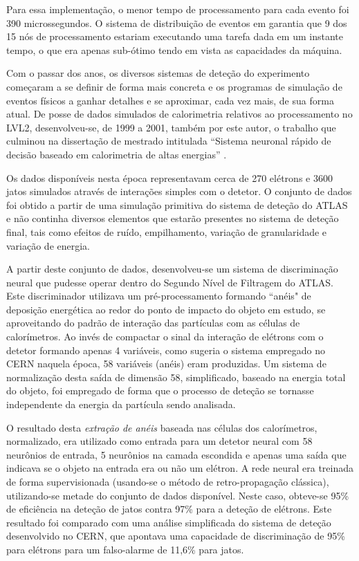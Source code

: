 Para essa implementação, o menor tempo de processamento para cada evento foi
390 microssegundos. O sistema de distribuição de eventos em
 garantia que 9 dos 15 nós de processamento estariam
executando uma tarefa dada em um instante tempo, o que era apenas sub-ótimo
tendo em vista as capacidades da máquina.

Com o passar dos anos, os diversos sistemas de deteção do experimento
começaram a se definir de forma mais concreta e os programas de simulação de
eventos físicos a ganhar detalhes e se aproximar, cada vez mais, de sua forma
atual. De posse de dados simulados de calorimetria relativos ao processamento
no LVL2, desenvolveu-se, de 1999 a 2001, também por este autor, o trabalho que
culminou na dissertação de mestrado intitulada ``Sistema neuronal rápido de
decisão baseado em calorimetria de altas energias'' \cite{aa:msc-thesis}.

Os dados disponíveis nesta época representavam cerca de 270 elétrons e 3600
jatos simulados através de interações simples com o detetor. O conjunto de
dados foi obtido a partir de uma simulação primitiva do sistema de deteção do
ATLAS e não continha diversos elementos que estarão presentes no sistema
de deteção final, tais como efeitos de ruído, empilhamento, variação de
granularidade e variação de energia.

A partir deste conjunto de dados, desenvolveu-se um sistema de discriminação
neural que pudesse operar dentro do Segundo Nível de Filtragem do ATLAS. Este
discriminador utilizava um pré-processamento formando ``anéis" de deposição
energética ao redor do ponto de impacto do objeto em estudo, se aproveitando
do padrão de interação das partículas com as células de calorímetros. Ao invés
de compactar o sinal da interação de elétrons com o detetor formando apenas 4
variáveis, como sugeria o sistema empregado no CERN naquela época, 58
variáveis (anéis) eram produzidas. Um sistema de normalização desta saída de
dimensão 58, simplificado, baseado na energia total do objeto, foi empregado
de forma que o processo de deteção se tornasse independente da energia da
partícula sendo analisada.

O resultado desta \textit{extração de anéis} baseada nas células dos
calorímetros, normalizado, era utilizado como entrada para um detetor neural
com 58 neurônios de entrada, 5 neurônios na camada escondida e apenas uma
saída que indicava se o objeto na entrada era ou não um elétron. A rede neural
era treinada de forma supervisionada (usando-se o método de retro-propagação
clássica), utilizando-se metade do conjunto de dados disponível. Neste caso,
obteve-se 95\% de eficiência na deteção de jatos contra 97\% para a deteção de
elétrons. Este resultado foi comparado com uma análise simplificada do sistema
de deteção desenvolvido no CERN, que apontava uma capacidade de discriminação
de 95\% para elétrons para um falso-alarme de 11,6\% para jatos.


